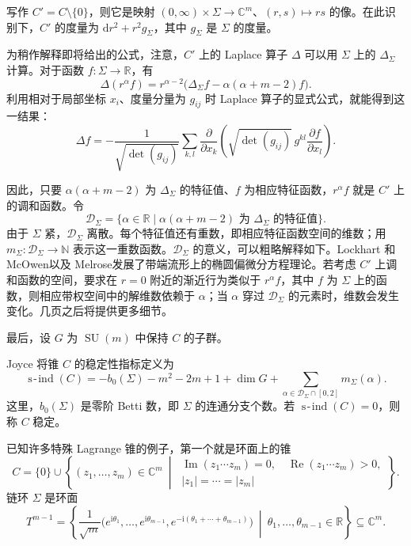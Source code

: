 写作 $C'=C\setminus\{0\}$，则它是映射 $(0,\infty)\times\Sigma\to\mathbb C^m$、$(r,s)\mapsto rs$ 的像。在此识别下，$C'$ 的度量为 $\mathrm dr^2+r^2g_\Sigma$，其中 $g_\Sigma$ 是 $\Sigma$ 的度量。

为稍作解释即将给出的公式，注意，$C'$ 上的 Laplace 算子 $\Delta$ 可以用 $\Sigma$ 上的 $\Delta_\Sigma$ 计算。对于函数 $f\colon\Sigma\to\mathbb R$，有
\begin{equation}\label{eq:7.5}
\Delta(r^\alpha f)
=r^{\alpha-2}\bigl(\Delta_\Sigma f-\alpha(\alpha+m-2)f\bigr).
\end{equation}
利用相对于局部坐标 $x_i$、度量分量为 $g_{ij}$ 时 Laplace 算子的显式公式，就能得到这一结果：
\[
\Delta f=-\frac1{\sqrt{\det(g_{ij})}}
\sum_{k,l}\frac\partial{\partial x_k}
\left(\sqrt{\det(g_{ij})}\,g^{kl}\frac{\partial f}{\partial x_l}\right).
\]

因此，只要 $\alpha(\alpha+m-2)$ 为 $\Delta_\Sigma$ 的特征值、$f$ 为相应特征函数，$r^\alpha f$ 就是 $C'$ 上的调和函数。令
\[
\mathcal D_\Sigma
=\{\alpha\in\mathbb R\mid\alpha(\alpha+m-2)
\text{ 为 }\Delta_\Sigma\text{ 的特征值}\}.
\]
由于 $\Sigma$ 紧，$\mathcal D_\Sigma$ 离散。每个特征值还有重数，即相应特征函数空间的维数；用 $m_\Sigma\colon\mathcal D_\Sigma\to\mathbb N$ 表示这一重数函数。$\mathcal D_\Sigma$ 的意义，可以粗略解释如下。Lockhart 和 McOwen以及 Melrose发展了带端流形上的椭圆偏微分方程理论。若考虑 $C'$ 上调和函数的空间，要求在 $r=0$ 附近的渐近行为类似于 $r^\alpha f$，其中 $f$ 为 $\Sigma$ 上的函数，则相应带权空间中的解维数依赖于 $\alpha$；当 $\alpha$ 穿过 $\mathcal D_\Sigma$ 的元素时，维数会发生变化。几页之后将提供更多细节。

最后，设 $G$ 为 $\operatorname{SU}(m)$ 中保持 $C$ 的子群。
\begin{definition*}
Joyce 将锥 $C$ 的稳定性指标定义为
\[
\operatorname{s\!\text{-}\!ind}(C)
=-b_0(\Sigma)-m^2-2m+1+\dim G
+\sum_{\alpha\in\mathcal D_\Sigma\cap[0,2]}m_\Sigma(\alpha).
\]
这里，$b_0(\Sigma)$ 是零阶 Betti 数，即 $\Sigma$ 的连通分支个数。若 $\operatorname{s\!\text{-}\!ind}(C)=0$，则称 $C$ 稳定。
\end{definition*}

已知许多特殊 Lagrange 锥的例子，第一个就是环面上的锥
\[
C=\{0\}\cup\left\{(z_1,\ldots,z_m)\in\mathbb C^m\ \middle|\
\begin{gathered}
\operatorname{Im}(z_1\cdots z_m)=0,\quad
\operatorname{Re}(z_1\cdots z_m)>0,\\
|z_1|=\cdots=|z_m|
\end{gathered}\right\}.
\]
链环 $\Sigma$ 是环面
\[
T^{m-1}=\left\{
\frac1{\sqrt m}\bigl(e^{\mathrm i\theta_1},\ldots,
e^{\mathrm i\theta_{m-1}},e^{-\mathrm i(\theta_1+\cdots+\theta_{m-1})}\bigr)
\ \middle|\ \theta_1,\ldots,\theta_{m-1}\in\mathbb R
\right\}\subseteq\mathbb C^m.
\]

